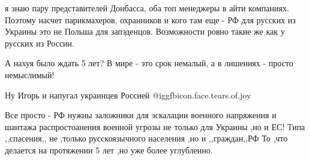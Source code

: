 \begin{itemize}

я знаю пару представителей Донбасса, оба топ менеджеры в айти компаниях.
Поэтому насчет парикмахеров, охранников и кого там еще - РФ для русских из
Украины это не Польша для запэденцов. Возможности ровно такие же как у русских
из России.


А нахуя было ждать 5 лет? В мире - это срок немалый, а в лишениях - просто немыслимый!

Ну Игорь и напугал украинцев Россией  @igg{fbicon.face.tears.of.joy} 


Все просто - РФ нужны заложники для эскалации военного напряжения и шантажа
распростоанения военной угрозы не только для Украины ,но и ЕС! Типа
,,спасения,, не ,только русскоязычного населения ,но и ,,граждан,,РФ То ,что
делается на протяжении 5 лет ,но уже более углубленно.

\end{itemize} %
